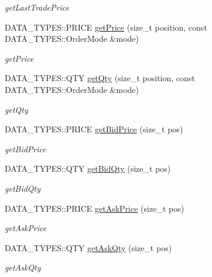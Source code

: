 \begin{DoxyCompactItemize}
\begin{DoxyCompactList}\small\item\em get\-Last\-Trade\-Price \end{DoxyCompactList}\item 
D\-A\-T\-A\-\_\-\-T\-Y\-P\-E\-S\-::\-P\-R\-I\-C\-E \hyperlink{class_a_p_i2_1_1_c_o_m_m_o_n_1_1_mkt_data_acc6ba70aa24dae69330b05285f22942d}{get\-Price} (size\-\_\-t position, const D\-A\-T\-A\-\_\-\-T\-Y\-P\-E\-S\-::\-Order\-Mode \&mode)
\begin{DoxyCompactList}\small\item\em get\-Price \end{DoxyCompactList}\item 
D\-A\-T\-A\-\_\-\-T\-Y\-P\-E\-S\-::\-Q\-T\-Y \hyperlink{class_a_p_i2_1_1_c_o_m_m_o_n_1_1_mkt_data_a8fdd8238abfb949a3c70b6c742a7e2f7}{get\-Qty} (size\-\_\-t position, const D\-A\-T\-A\-\_\-\-T\-Y\-P\-E\-S\-::\-Order\-Mode \&mode)
\begin{DoxyCompactList}\small\item\em get\-Qty \end{DoxyCompactList}\item 
D\-A\-T\-A\-\_\-\-T\-Y\-P\-E\-S\-::\-P\-R\-I\-C\-E \hyperlink{class_a_p_i2_1_1_c_o_m_m_o_n_1_1_mkt_data_a162e50a3d866561b2143dbd260d68bb4}{get\-Bid\-Price} (size\-\_\-t pos)
\begin{DoxyCompactList}\small\item\em get\-Bid\-Price \end{DoxyCompactList}\item 
D\-A\-T\-A\-\_\-\-T\-Y\-P\-E\-S\-::\-Q\-T\-Y \hyperlink{class_a_p_i2_1_1_c_o_m_m_o_n_1_1_mkt_data_a4cdac77ae6e740962ac4bf67cda226f1}{get\-Bid\-Qty} (size\-\_\-t pos)
\begin{DoxyCompactList}\small\item\em get\-Bid\-Qty \end{DoxyCompactList}\item 
D\-A\-T\-A\-\_\-\-T\-Y\-P\-E\-S\-::\-P\-R\-I\-C\-E \hyperlink{class_a_p_i2_1_1_c_o_m_m_o_n_1_1_mkt_data_ab986bba84db8307d955aa31bdd327e22}{get\-Ask\-Price} (size\-\_\-t pos)
\begin{DoxyCompactList}\small\item\em get\-Ask\-Price \end{DoxyCompactList}\item 
D\-A\-T\-A\-\_\-\-T\-Y\-P\-E\-S\-::\-Q\-T\-Y \hyperlink{class_a_p_i2_1_1_c_o_m_m_o_n_1_1_mkt_data_ac7e2e92d87bd2645a719c8dd51246fa2}{get\-Ask\-Qty} (size\-\_\-t pos)
\begin{DoxyCompactList}\small\item\em get\-Ask\-Qty \end{DoxyCompactList}\item 

\end{DoxyCompactItemize}
